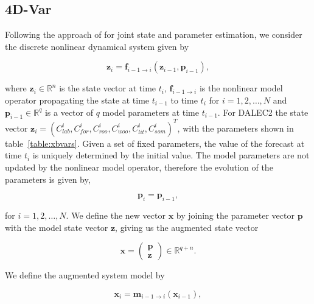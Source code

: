 \documentclass[review]{elsarticle}
\begin{document}
\subsection{4D-Var} \label{4dvar}

Following the approach of \citet{Smith2011436} for joint state and parameter estimation, we consider the discrete nonlinear dynamical system given by
\begin{linenomath}
\begin{equation}
\textbf{z}_{i} = \textbf{f}_{i-1\rightarrow i}(\textbf{z}_{i-1}, \textbf{p}_{i-1}),
\end{equation}
\end{linenomath}
where \( \textbf{z}_{i} \in \mathbb{R}^{n} \) is the state vector at time \( t_i \), \(\textbf{f}_{i-1 \rightarrow i}\) is the nonlinear model operator propagating the state at time \(t_{i-1}\) to time \(t_{i}\) for \(i = 1, 2, \dots, N\) and \(\textbf{p}_{i-1} \in \mathbb{R}^{q}\) is a vector of \(q\) model parameters at time \(t_{i-1}\). For DALEC2 the state vector \(\textbf{z}_{i}=(C_{lab}^{i}, C_{for}^{i}, C_{roo}^{i}, C_{woo}^{i}, C_{lit}^{i}, C_{som}^{i})^{T}\), with the parameters shown in table~\ref{table:xbvars}. Given a set of fixed parameters, the value of the forecast at time \(t_i\) is uniquely determined by the initial value. The model parameters are not updated by the nonlinear model operator, therefore the evolution of the parameters is given by,
\begin{linenomath}
\begin{equation}
\textbf{p}_{i} = \textbf{p}_{i-1}, 
\end{equation}
\end{linenomath}
for $i= 1, 2, \dots, N$. We define the new vector $\textbf{x}$ by joining the parameter vector $\textbf{p}$ with the model state vector $\textbf{z}$, giving us the augmented state vector
\begin{linenomath}
\begin{equation}
\textbf{x} =
\begin{pmatrix}
\textbf{p} \\
\textbf{z}
\end{pmatrix}
\in \mathbb{R}^{q+n}.
\end{equation}
\end{linenomath}
We define the augmented system model by
\begin{linenomath}
\begin{equation}
\textbf{x}_{i} = \textbf{m}_{i-1 \rightarrow i}(\textbf{x}_{i-1}), \label{eqn:nonlinmod}
\end{equation}
\end{linenomath}
\end{document}
